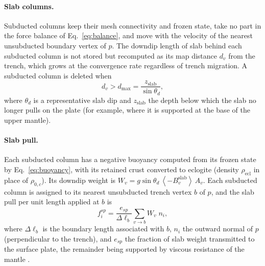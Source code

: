\documentclass[11pt]{article}
\newcommand{\mac}[1]{\left\langle #1 \right\rangle}
\begin{document}
\paragraph{Slab columns.}
Subducted columns keep their mesh connectivity and frozen state, take no part
in the force balance of Eq.~\eqref{eq:balance}, and move with the velocity of
the nearest unsubducted boundary vertex of $p$. The downdip length of slab
behind each subducted column is not stored but recomputed as its map distance
$d_v$ from the trench, which grows at the convergence rate regardless of trench
migration. A subducted column is deleted when
\begin{equation}
  d_v > d_{\max} = \frac{z_{\mathrm{slab}}}{\sin\theta_d},
\end{equation}
where $\theta_d$ is a representative slab dip and $z_{\mathrm{slab}}$ the depth
below which the slab no longer pulls on the plate (for example, where it is
supported at the base of the upper mantle).

\paragraph{Slab pull.}
Each subducted column has a negative buoyancy computed from its frozen state by
Eq.~\eqref{eq:buoyancy}, with its retained crust converted to eclogite (density
$\rho_{\mathrm{ecl}}$ in place of $\rho_{0,c}$). Its downdip weight is
$W_v = g\sin\theta_d\,\mac{-B_v^{\mathrm{slab}}}\,A_v$. Each subducted column is
assigned to its nearest unsubducted trench vertex $b$ of $p$, and the slab pull
per unit length applied at $b$ is
\begin{equation}
  f^{sp}_i = \frac{e_{sp}}{\Delta\ell_b}\sum_{v\to b} W_v\; n_i,
\end{equation}
where $\Delta\ell_b$ is the boundary length associated with $b$, $n_i$ the
outward normal of $p$ (perpendicular to the trench), and $e_{sp}$ the fraction of
slab weight transmitted to the surface plate, the remainder being supported by
viscous resistance of the mantle \cite{ConradLithgow2002}.
\end{document}
